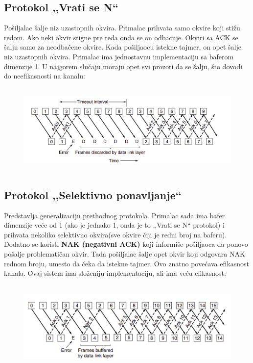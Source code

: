 \documentclass[a4paper]{article}
\begin{document}
    \subsection{Protokol ,,Vrati se N``}
        Pošiljalac šalje niz uzastopnih okvira. Primalac prihvata samo okvire koji stižu redom. 
        Ako neki okvir stigne pre reda onda se on odbacuje. Okviri sa ACK se šalju samo za 
        neodbačene okvire. Kada pošiljaocu istekne tajmer, on opet šalje niz uzastopnih
        okvira. Primalac ima jednostavnu implementaciju sa baferom dimenzije 1. U najgorem slučaju
        moraju opet svi prozori da se šalju, što dovodi do neefikasnosti na kanalu:
        \begin{figure}[H]
            \begin{center}
                \includegraphics[width=120mm,height=45mm]{Slike/prozori3.png}
            \end{center}
        \end{figure}
    \newpage
    \subsection{Protokol ,,Selektivno ponavljanje``}
        Predstavlja generalizaciju prethodnog protokola. Primalac sada ima bafer dimenzije
        veće od 1 (ako je jednako 1, onda je to ,,Vrati se N`` protokol) 
        i prihvata nekoliko selektivno okvira(sve okvire čiji je redni broj na baferu). 
        Dodatno se koristi \textbf{NAK (negativni ACK)} koji informiše pošiljaoca 
        da ponovo pošalje problematičan okvir. Tada pošiljalac šalje opet okvir koji odgovara
        NAK rednom broju, umesto da čeka da istekne tajmer. Ovo znatno povećava
        efikasnost kanala. Ovaj sistem ima složeniju implementaciju, ali ima veću efikasnost:  
        \begin{figure}[H]
            \begin{center}
                \includegraphics[width=120mm,height=45mm]{Slike/prozori4.png}
            \end{center}
        \end{figure} 
\end{document}

